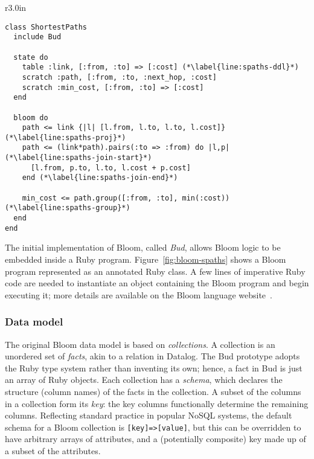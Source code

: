 \begin{wrapfigure}[=18]{r}{3.0in}
\begin{scriptsize}
\begin{lstlisting}
class ShortestPaths
  include Bud

  state do
    table :link, [:from, :to] => [:cost] (*\label{line:spaths-ddl}*)
    scratch :path, [:from, :to, :next_hop, :cost]
    scratch :min_cost, [:from, :to] => [:cost]
  end

  bloom do
    path <= link {|l| [l.from, l.to, l.to, l.cost]} (*\label{line:spaths-proj}*)
    path <= (link*path).pairs(:to => :from) do |l,p| (*\label{line:spaths-join-start}*)
      [l.from, p.to, l.to, l.cost + p.cost]
    end (*\label{line:spaths-join-end}*)

    min_cost <= path.group([:from, :to], min(:cost)) (*\label{line:spaths-group}*)
  end
end
\end{lstlisting}
\end{scriptsize}
\caption{All-pairs shortest paths of a directed graph in Bloom.}
\label{fig:bloom-spaths}
\end{wrapfigure}
The initial implementation of Bloom, called \emph{Bud}, allows Bloom logic to be
embedded inside a Ruby program. Figure~\ref{fig:bloom-spaths} shows a Bloom
program represented as an annotated Ruby class. A few lines of imperative
Ruby code are needed to instantiate an object containing the Bloom program and begin executing it;
more details are available on the Bloom language website~\cite{bloom-website}.

\subsubsection{Data model}

The original Bloom data model is based on \emph{collections}.  A collection is an
unordered set of \emph{facts}, akin to a relation in Datalog. The Bud prototype
adopts the Ruby type system rather than inventing its own; hence, a fact in Bud
is just an array of Ruby objects. Each collection has a \emph{schema}, which
declares the structure (column names) of the facts in the collection. A subset
of the columns in a collection form its \emph{key}: 
the key columns functionally determine the remaining columns. 
Reflecting standard practice in popular NoSQL systems, the default schema for a Bloom collection is \texttt{[key]=>[value]}, but this can be overridden to have arbitrary arrays of attributes, and a (potentially composite) key made up of a subset of the attributes.

